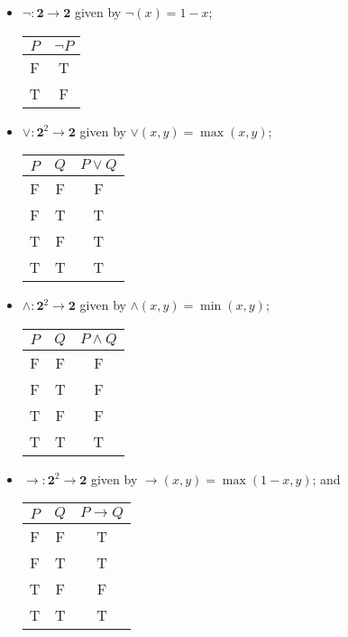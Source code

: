 \documentclass[12pt]{article}
\begin{document}
\begin{itemize}
\item
$\lnot: \boldsymbol{2} \to \boldsymbol{2}$ given by $\lnot(x)=1-x$;

\begin{center}
\begin{tabular}{cc}
$P$ & $\lnot P$ \\
\hline
F & T \\
T & F 
\end{tabular}
\end{center}

\item
$\lor: \boldsymbol{2}^2 \to \boldsymbol{2}$ given by $\lor(x,y)=\max(x,y)$;

\begin{center}
\begin{tabular}{ccc}
$P$ & $Q$ & $P \lor Q$ \\
\hline
F & F & F \\
F & T & T \\
T & F & T \\
T & T & T
\end{tabular}
\end{center}

\item
$\land: \boldsymbol{2}^2 \to \boldsymbol{2}$ given by $\land(x,y)=\min(x,y)$;

\begin{center}
\begin{tabular}{ccc}
$P$ & $Q$ & $P \land Q$ \\
\hline
F & F & F \\
F & T & F \\
T & F & F \\
T & T & T
\end{tabular}
\end{center}

\item
$\rightarrow: \boldsymbol{2}^2 \to \boldsymbol{2}$ given by $\rightarrow(x,y)=\max(1-x,y)$; and 

\begin{center}
\begin{tabular}{ccc}
$P$ & $Q$ & $P \rightarrow Q$ \\
\hline
F & F & T \\
F & T & T \\
T & F & F \\
T & T & T
\end{tabular}
\end{center}


\end{itemize}
\end{document}

